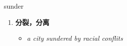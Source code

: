 
\begin{frame}
{\huge sunder}
\begin{center}
\begin{enumerate}\Large
  \item \textbf{分裂，分离}
  \begin{itemize}
    \item \em{\Large{a city sundered by racial conflits}}
  \end{itemize}
\end{enumerate}
\end{center}
\end{frame}

